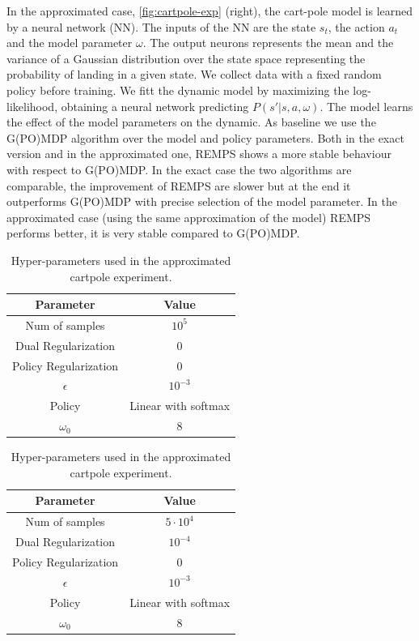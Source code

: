 In the approximated case, \cref{fig:cartpole-exp} (right),  the cart-pole model is learned by a neural network (NN). The inputs of the NN are the state $s_t$, the action $a_t$ and the model parameter $\omega$. The output neurons represents the mean and the variance of a Gaussian distribution over the state space representing the probability of landing in a given state.
We collect data with a fixed random policy before training. We fitt the dynamic model by maximizing the log-likelihood, obtaining a neural network predicting $P(s' | s, a, \omega)$.
The model learns the effect of the model parameters on the dynamic.
As baseline we use the G(PO)MDP algorithm over the model and policy parameters. Both in the exact version and in the approximated one, REMPS shows a more stable behaviour with respect to G(PO)MDP. In the exact case the two algorithms are comparable, the improvement of REMPS are slower but at the end it outperforms G(PO)MDP with precise selection of the model parameter. \newline
In the approximated case (using the same approximation of the model) REMPS performs better, it is very stable compared to G(PO)MDP. \newline

\begin{table}[!tb]
\centering
\begin{tabular}{ c c}
  \toprule			
  Parameter & Value \\
  \midrule
  Num of samples & $10^5$ \\
  Dual Regularization & 0 \\
  Policy Regularization & 0 \\
  $\epsilon$ & $10^{-3}$ \\
  Policy & Linear with softmax \\
  $\omega_0$ & 8 \\
\bottomrule
\end{tabular}
\caption{Hyper-parameters used in the exact cartpole experiment.} \label{tab:cartpole-hyperparameters-exact}

\vspace*{1 cm}

\begin{tabular}{ c c }
  \toprule			
  Parameter & Value \\
  \midrule
  Num of samples & $5 \cdot 10^4$ \\
  Dual Regularization & $10^{-4}$ \\
  Policy Regularization & $0$ \\
  $\epsilon$ & $10^{-3}$ \\
  Policy & Linear with softmax \\
  $\omega_0$ & 8 \\
\bottomrule
\end{tabular}
\caption{Hyper-parameters used in the approximated cartpole experiment.} \label{tab:cartpole-hyperparameters-approx}

\end{table}

